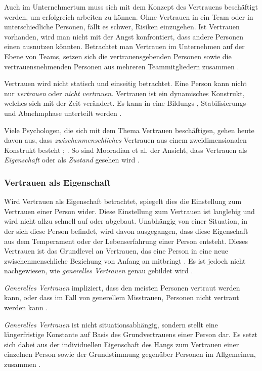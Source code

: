 \documentclass[a4paper,11pt]{article}%
\renewcommand{\\}{\vspace*{0.5\baselineskip} \newline}
\begin{document}
Auch im Unternehmertum muss sich mit dem Konzept des Vertrauens beschäftigt werden, um erfolgreich arbeiten zu können. Ohne Vertrauen in ein Team oder in unterschiedliche Personen, fällt es schwer, Risiken einzugehen. Ist Vertrauen vorhanden, wird man nicht mit der Angst konfrontiert, dass andere Personen einen ausnutzen könnten. Betrachtet man Vertrauen im Unternehmen auf der Ebene von Teams, setzen sich die vertrauensgebenden Personen sowie die vertrauensnehmenden Personen aus mehreren Teammitgliedern zusammen \citep[S. 1152]{breuer2016does}.

Vertrauen wird nicht statisch und einseitig betrachtet. Eine Person kann nicht nur \textit{vertrauen} oder \textit{nicht vertrauen}. Vertrauen ist ein dynamisches Konstrukt, welches sich mit der Zeit verändert. Es kann in eine Bildungs-, Stabilisierungs- und Abnehmphase unterteilt werden \citep[S. 396]{rousseau1998not}.

Viele Psychologen, die sich mit dem Thema Vertrauen beschäftigen, gehen heute davon aus, dass \textit{zwischenmenschliches} Vertrauen aus einem zweidimensionalen Konstrukt besteht \citep{johnson2005cognitive}; \citep{cook1980new}. So sind Mooradian et al. der Ansicht, dass Vertrauen als \textit{Eigenschaft} oder als \textit{Zustand} gesehen wird \citep[S. 524-525]{mooradian2006trusts}.

\subsubsection{Vertrauen als Eigenschaft }
\label{Vertrauen als Eigenschaft}
Wird Vertrauen als Eigenschaft betrachtet, spiegelt dies die Einstellung zum Vertrauen einer Person wider. Diese Einstellung zum Vertrauen ist langlebig und wird nicht allzu schnell auf oder abgebaut. Unabhängig von einer Situation, in der sich diese Person befindet, wird davon ausgegangen, dass diese Eigenschaft aus dem Temperament oder der Lebenserfahrung einer Person entsteht. Dieses Vertrauen ist das Grundlevel an Vertrauen, das eine Person in eine neue zwischenmenschliche Beziehung von Anfang an mitbringt \citep[S. 11]{couch1996assessment}. Es ist jedoch nicht nachgewiesen, wie \textit{generelles Vertrauen} genau gebildet wird \citep[S. 409]{stolle2002trusting}.

\textit{Generelles Vertrauen} impliziert, dass den meisten Personen vertraut werden kann, oder dass im Fall von generellem Misstrauen, Personen nicht vertraut werden kann \citep[S. 409]{stolle2002trusting}.

\textit{Generelles Vertrauen} ist nicht situationsabhängig, sondern stellt eine längerfristige Konstante auf Basis des Grundvertrauens einer Person dar. Es setzt sich dabei aus der individuellen Eigenschaft des Hangs zum Vertrauen einer einzelnen Person sowie der Grundstimmung gegenüber Personen im Allgemeinen, zusammen \citep[S. 11]{couch1996assessment}.
\end{document}

